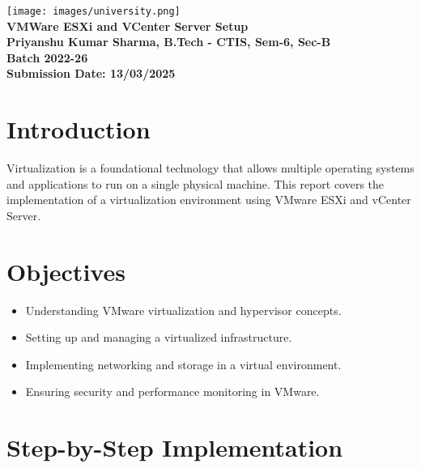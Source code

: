 \documentclass[a4paper,12pt]{article}
\begin{document}
\begin{center}
    \texttt{[image: images/university.png]}  %
    \\[10pt]
    \textbf{\LARGE VMWare ESXi and VCenter Server Setup}\\[10pt]
    \textbf{Priyanshu Kumar Sharma, B.Tech - CTIS, Sem-6, Sec-B}\\[5pt]
    \textbf{Batch 2022-26}\\[5pt]
    \textbf{Submission Date: 13/03/2025}
\end{center}

\section{Introduction}
Virtualization is a foundational technology that allows multiple operating systems and applications to run on a single physical machine. This report covers the implementation of a virtualization environment using VMware ESXi and vCenter Server.

\section{Objectives}
\begin{itemize}
    \item Understanding VMware virtualization and hypervisor concepts.
    \item Setting up and managing a virtualized infrastructure.
    \item Implementing networking and storage in a virtual environment.
    \item Ensuring security and performance monitoring in VMware.
\end{itemize}

\section{Step-by-Step Implementation}
\end{document}
